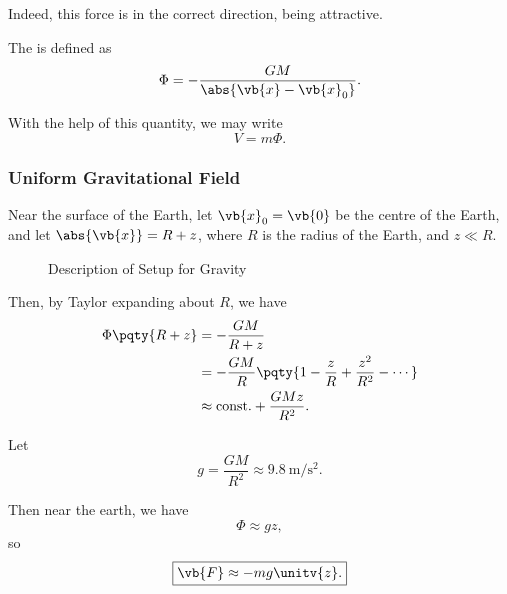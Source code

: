 Indeed, this force is in the correct direction, being attractive.

\begin{definition}
    \label{def:gp}%
    The  is defined as
    \begin{equation}
    \Phi = - \frac{GM}{\abs{\vb{x} - \vb{x}_0}}.
    \end{equation}
\end{definition}

With the help of this quantity, we may write
\begin{equation}
    V = m \Phi.
\end{equation}

\subsubsection{Uniform Gravitational Field}

Near the surface of the Earth, let \(\vb{x}_0 = \vb{0}\) be the centre of the Earth, and let \(\abs{\vb{x}} = R + z\), where \(R\) is the radius of the Earth, and \(z \ll R\).

\begin{figure}[ht!]
    \centering
    \caption{Description of Setup for Gravity}
    \label{fig:description-of-setup-for-gravity}%
\end{figure}

Then, by Taylor expanding about \(R\), we have
\begin{subequations}\begin{align}
    \Phi\pqty{R + z} &= - \frac{GM}{R + z} \\
    &= - \frac{GM}{R} \pqty{1 - \frac{z}{R} + \frac{z^2}{R^2} - \cdots} \\
    &\approx \text{const.} + \frac{GMz}{R^2}.
\end{align}\end{subequations}

Let
\begin{equation}
    g = \frac{GM}{R^2} \approx \SI{9.8}{\metre\per\second\squared}.
\end{equation}

Then near the earth, we have
\begin{equation}
    \boxed{\Phi \approx gz,}
\end{equation}
so
\begin{equation}
    \boxed{\vb{F} \approx - mg \unitv{z}.}
\end{equation}

